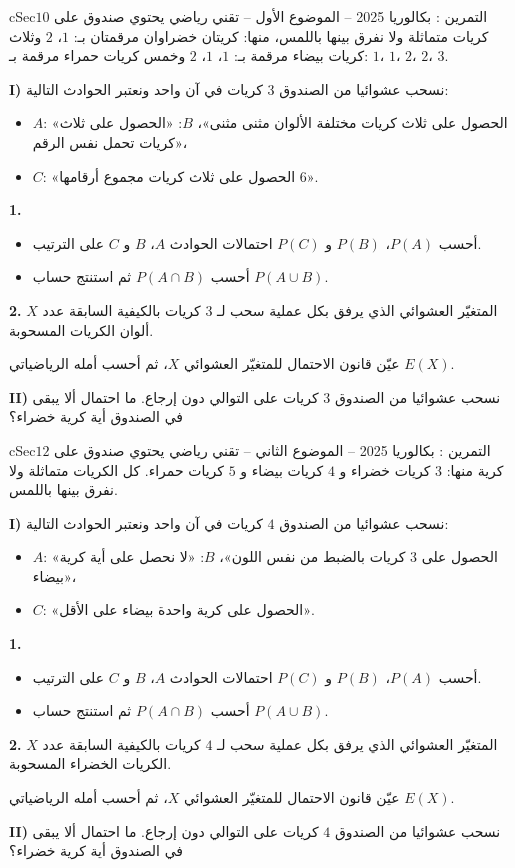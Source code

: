 \documentclass[12pt,a4paper]{article}
\newenvironment{BOX}[2]{\begin{otherlanguage}{english}\begin{arbox}{#1}{#2}}{\end{arbox}\end{otherlanguage}}
\newcounter{exo}
\newenvironment{tamrin}[1]{\stepcounter{exo}\begin{BOX}{cSec}{التمرين \theexo: #1}}{\end{BOX}}
\newenvironment{sq}{\begin{itemize}[leftmargin=2.4em,itemsep=3pt]}{\end{itemize}}
\newcommand{\qa}{\item[(أ)]}\newcommand{\qb}{\item[(ب)]}\newcommand{\qc}{\item[(جـ)]}\newcommand{\qd}{\item[(د)]}\newcommand{\qe}{\item[(هـ)]}
\newcommand{\QQ}[1]{\par\smallskip\textbf{#1.} }
\begin{document}
\begin{tamrin}{بكالوريا 2025 -- الموضوع الأول -- تقني رياضي}
يحتوي صندوق على $10$ كريات متماثلة ولا نفرق بينها باللمس، منها: كريتان خضراوان مرقمتان بـ: $1$، $2$ وثلاث كريات بيضاء مرقمة بـ: $1$، $1$، $2$ وخمس كريات حمراء مرقمة بـ: $1$، $1$، $2$، $2$، $3$.

\textbf{I)} نسحب عشوائيا من الصندوق $3$ كريات في آن واحد ونعتبر الحوادث التالية:
\begin{itemize}
\item $A$: «الحصول على ثلاث كريات مختلفة الألوان مثنى مثنى»، \quad $B$: «الحصول على ثلاث كريات تحمل نفس الرقم»،
\item $C$: «الحصول على ثلاث كريات مجموع أرقامها $6$».
\end{itemize}
\QQ{1}
\begin{sq}
\qa أحسب $P(A)$، $P(B)$ و $P(C)$ احتمالات الحوادث $A$، $B$ و $C$ على الترتيب.
\qb أحسب $P(A\cap B)$ ثم استنتج حساب $P(A\cup B)$.
\end{sq}
\QQ{2} $X$ المتغيّر العشوائي الذي يرفق بكل عملية سحب لـ $3$ كريات بالكيفية السابقة عدد ألوان الكريات المسحوبة.

عيّن قانون الاحتمال للمتغيّر العشوائي $X$، ثم أحسب أمله الرياضياتي $E(X)$.

\textbf{II)} نسحب عشوائيا من الصندوق $3$ كريات على التوالي دون إرجاع. ما احتمال ألا يبقى في الصندوق أية كرية خضراء؟
\end{tamrin}

\begin{tamrin}{بكالوريا 2025 -- الموضوع الثاني -- تقني رياضي}
يحتوي صندوق على $12$ كرية منها: $3$ كريات خضراء و $4$ كريات بيضاء و $5$ كريات حمراء. كل الكريات متماثلة ولا نفرق بينها باللمس.

\textbf{I)} نسحب عشوائيا من الصندوق $4$ كريات في آن واحد ونعتبر الحوادث التالية:
\begin{itemize}
\item $A$: «الحصول على $3$ كريات بالضبط من نفس اللون»، \quad $B$: «لا نحصل على أية كرية بيضاء»،
\item $C$: «الحصول على كرية واحدة بيضاء على الأقل».
\end{itemize}
\QQ{1}
\begin{sq}
\qa أحسب $P(A)$، $P(B)$ و $P(C)$ احتمالات الحوادث $A$، $B$ و $C$ على الترتيب.
\qb أحسب $P(A\cap B)$ ثم استنتج حساب $P(A\cup B)$.
\end{sq}
\QQ{2} $X$ المتغيّر العشوائي الذي يرفق بكل عملية سحب لـ $4$ كريات بالكيفية السابقة عدد الكريات الخضراء المسحوبة.

عيّن قانون الاحتمال للمتغيّر العشوائي $X$، ثم أحسب أمله الرياضياتي $E(X)$.

\textbf{II)} نسحب عشوائيا من الصندوق $4$ كريات على التوالي دون إرجاع. ما احتمال ألا يبقى في الصندوق أية كرية خضراء؟
\end{tamrin}
\end{document}
